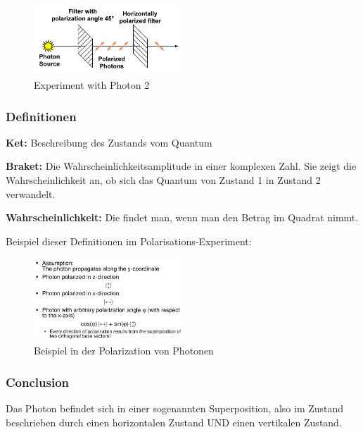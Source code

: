 \begin{figure}[H]
\centering
\includegraphics[width=0.5\textwidth]{figures/photonExperiment2.png}
\caption{Experiment with Photon 2}
\end{figure}

\hypertarget{definitionen}{%
\subsubsection{Definitionen}\label{definitionen}}

\textbf{Ket:} Beschreibung des Zustands vom Quantum

\textbf{Braket:} Die Wahrscheinlichkeitsamplitude in einer komplexen
Zahl. Sie zeigt die Wahrscheinlichkeit an, ob sich das Quantum von
Zustand 1 in Zustand 2 verwandelt.

\textbf{Wahrscheinlichkeit:} Die findet man, wenn man den Betrag im
Quadrat nimmt.

Beispiel dieser Definitionen im Polarisations-Experiment:

\begin{figure}[H]
\centering
\includegraphics[width=0.5\textwidth]{figures/polarizationExample.png}
\caption{Beispiel in der Polarization von Photonen}
\end{figure}

\hypertarget{conclusion}{%
\subsubsection{Conclusion}\label{conclusion}}

Das Photon befindet sich in einer sogenannten Superposition, also im
Zustand beschrieben durch einen horizontalen Zustand UND einen
vertikalen Zustand.

